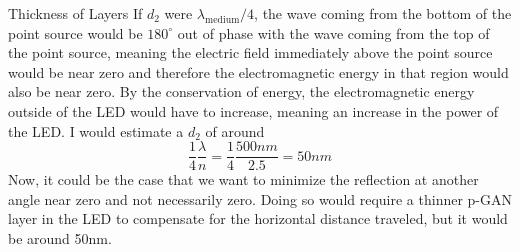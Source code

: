 \documentclass[12pt]{article}
\newcommand{\enterProblemHeader}[1]{
	\rhead{#1}
}
\newenvironment{main_section}[1]{
	\section{#1}
	\enterProblemHeader{#1}
}{
	\pagebreak
}
\begin{document}
\begin{main_section}{Thickness of Layers}
	If $d_2$ were $\lambda_\text{medium}/4$, the wave coming from the bottom of
	the point source would be $180^\circ$ out of phase with the wave coming from
	the top of the point source, meaning the electric field immediately above
	the point source would be near zero and therefore the electromagnetic energy
	in that region would also be near zero. By the conservation of energy, the
	electromagnetic energy outside of the LED would have to increase, meaning an
	increase in the power of the LED. I would estimate a $d_2$ of around
	\[
		\frac 1 4 \frac \lambda n = \frac 14 \frac {500 \si{nm}} {2.5} = 50
		\si{nm}
	\]
	Now, it could be the case that we want to minimize the reflection at another
	angle near zero and not necessarily zero. Doing so would require a thinner
	p-GAN layer in the LED to compensate for the horizontal distance traveled,
	but it would be around 50nm.
\end{main_section}

\newcommand{\nled}{n_\text{LED}}
\newcommand{\nmat}{n_\text{Material}}
\newcommand{\nair}{n_\text{Air}}
\newcommand{\rledmat}{R_\text{LED-Material}}
\newcommand{\tledmat}{T_\text{LED-Material}}
\newcommand{\rmatair}{R_\text{Material-Air}}
\end{document}
